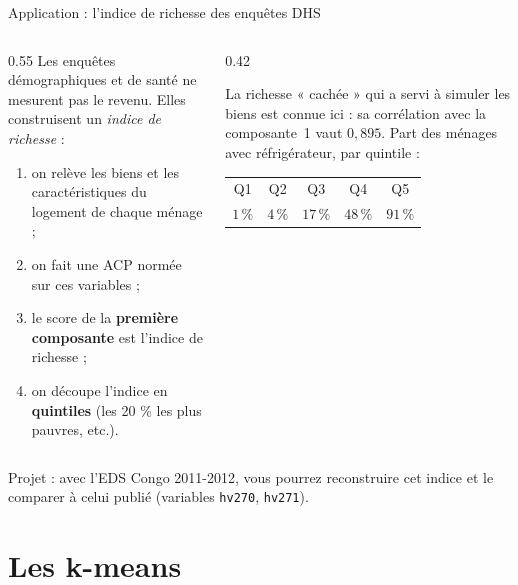 \documentclass[aspectratio=169,11pt]{beamer}
\begin{document}
\begin{frame}{Application : l'indice de richesse des enquêtes DHS}
  \begin{columns}[T]
    \begin{column}{0.55\textwidth}
      \small
      Les enquêtes démographiques et de santé ne mesurent pas le revenu. Elles construisent un \emph{indice de richesse} :
      \begin{enumerate}\setlength\itemsep{1pt}
        \item on relève les biens et les caractéristiques du logement de chaque ménage ;
        \item on fait une ACP normée sur ces variables ;
        \item le score de la \textbf{première composante} est l'indice de richesse ;
        \item on découpe l'indice en \textbf{quintiles} (les 20 \% les plus pauvres, etc.).
      \end{enumerate}
    \end{column}
    \begin{column}{0.42\textwidth}
      \begin{exemple}
        La richesse « cachée » qui a servi à simuler les biens est connue ici : sa corrélation avec la composante~1 vaut $0{,}895$.
        \vskip1mm
        Part des ménages avec réfrigérateur, par quintile :
        \begin{center}
          \begin{tabular}{ccccc}
            Q1 & Q2 & Q3 & Q4 & Q5 \\
            $1\,\%$ & $4\,\%$ & $17\,\%$ & $48\,\%$ & $91\,\%$
          \end{tabular}
        \end{center}
      \end{exemple}
    \end{column}
  \end{columns}
  \vskip1mm
  {\small\color{cnfGris}Projet : avec l'EDS Congo 2011-2012, vous pourrez reconstruire cet indice et le comparer à celui publié (variables \texttt{hv270}, \texttt{hv271}).}
\end{frame}

\section{Les k-means}
\end{document}
